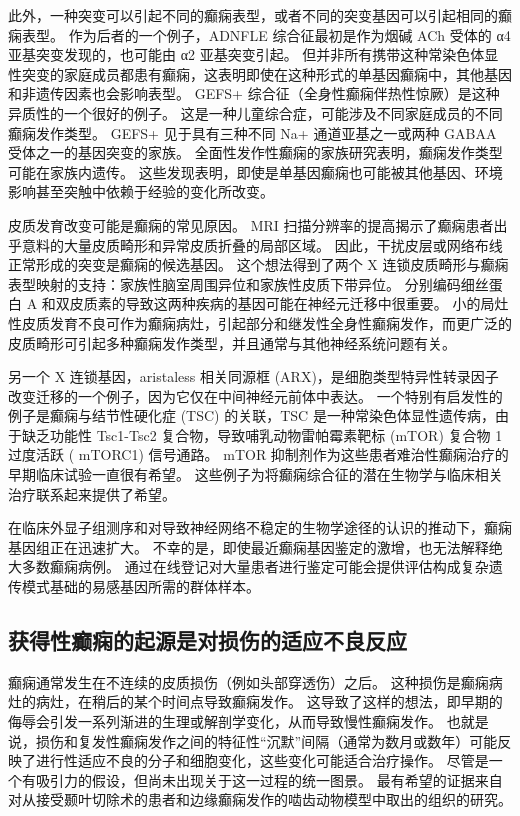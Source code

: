 此外，一种突变可以引起不同的癫痫表型，或者不同的突变基因可以引起相同的癫痫表型。 作为后者的一个例子，ADNFLE 综合征最初是作为烟碱 ACh 受体的 α4 亚基突变发现的，也可能由 α2 亚基突变引起。 但并非所有携带这种常染色体显性突变的家庭成员都患有癫痫，这表明即使在这种形式的单基因癫痫中，其他基因和非遗传因素也会影响表型。 GEFS+ 综合征（全身性癫痫伴热性惊厥）是这种异质性的一个很好的例子。 这是一种儿童综合症，可能涉及不同家庭成员的不同癫痫发作类型。 GEFS+ 见于具有三种不同 Na+ 通道亚基之一或两种 GABAA 受体之一的基因突变的家族。 全面性发作性癫痫的家族研究表明，癫痫发作类型可能在家族内遗传。 这些发现表明，即使是单基因癫痫也可能被其他基因、环境影响甚至突触中依赖于经验的变化所改变。

皮质发育改变可能是癫痫的常见原因。 MRI 扫描分辨率的提高揭示了癫痫患者出乎意料的大量皮质畸形和异常皮质折叠的局部区域。 因此，干扰皮层或网络布线正常形成的突变是癫痫的候选基因。 这个想法得到了两个 X 连锁皮质畸形与癫痫表型映射的支持：家族性脑室周围异位和家族性皮质下带异位。 分别编码细丝蛋白 A 和双皮质素的导致这两种疾病的基因可能在神经元迁移中很重要。 小的局灶性皮质发育不良可作为癫痫病灶，引起部分和继发性全身性癫痫发作，而更广泛的皮质畸形可引起多种癫痫发作类型，并且通常与其他神经系统问题有关。

另一个 X 连锁基因，aristaless 相关同源框 (ARX)，是细胞类型特异性转录因子改变迁移的一个例子，因为它仅在中间神经元前体中表达。 一个特别有启发性的例子是癫痫与结节性硬化症 (TSC) 的关联，TSC 是一种常染色体显性遗传病，由于缺乏功能性 Tsc1-Tsc2 复合物，导致哺乳动物雷帕霉素靶标 (mTOR) 复合物 1 过度活跃 ( mTORC1) 信号通路。 mTOR 抑制剂作为这些患者难治性癫痫治疗的早期临床试验一直很有希望。 这些例子为将癫痫综合征的潜在生物学与临床相关治疗联系起来提供了希望。

在临床外显子组测序和对导致神经网络不稳定的生物学途径的认识的推动下，癫痫基因组正在迅速扩大。 不幸的是，即使最近癫痫基因鉴定的激增，也无法解释绝大多数癫痫病例。 通过在线登记对大量患者进行鉴定可能会提供评估构成复杂遗传模式基础的易感基因所需的群体样本。

\subsection{获得性癫痫的起源是对损伤的适应不良反应}
癫痫通常发生在不连续的皮质损伤（例如头部穿透伤）之后。 这种损伤是癫痫病灶的病灶，在稍后的某个时间点导致癫痫发作。 这导致了这样的想法，即早期的侮辱会引发一系列渐进的生理或解剖学变化，从而导致慢性癫痫发作。 也就是说，损伤和复发性癫痫发作之间的特征性“沉默”间隔（通常为数月或数年）可能反映了进行性适应不良的分子和细胞变化，这些变化可能适合治疗操作。 尽管是一个有吸引力的假设，但尚未出现关于这一过程的统一图景。 最有希望的证据来自对从接受颞叶切除术的患者和边缘癫痫发作的啮齿动物模型中取出的组织的研究。

